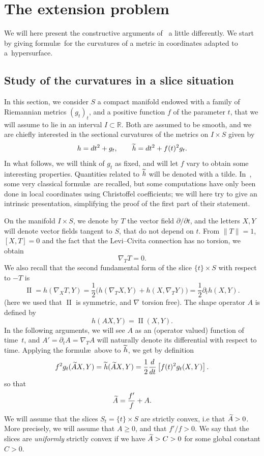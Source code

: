 \documentclass[AHL,Unicode,longabstracts,published]{cedram}
\newcommand{\R}{\mathbb{R}}
\DeclareMathOperator{\II}{II}
\theoremstyle{plain}
\let\oldtilde\tilde
\renewcommand*{\tilde}[1]{\mathchoice{\widetilde{#1}}{\widetilde{#1}}{\oldtilde{#1}}{\oldtilde{#1}}}
\begin{document}
\section{The extension problem}
\label{sec:metric-extension}

We will here present the constructive arguments of~\cite{Chen-Erchenko-Gogolev} a little differently. We start by giving formul\ae\ for the curvatures of a metric in coordinates adapted to a~hypersurface.

\subsection{Study of the curvatures in a slice situation}

In this section, we consider $S$ a compact manifold endowed with a family of Riemannian metrics $(g_t)_t$, and a positive function $f$ of the parameter $t$, that we will assume to lie in an interval $I\subset \R$. Both are assumed to be smooth, and we are chiefly interested in the sectional curvatures of the metrics on $I\times S$ given by
\begin{equation}\label{eq:conformal-slice}
h= dt^2 + g_t,\qquad \tilde{h} = dt^2 + f(t)^2 g_t.
\end{equation}
In what follows, we will think of $g_t$ as fixed, and will let $f$ vary to obtain some interesting properties. Quantities related to $\tilde{h}$ will be denoted with a tilde. In~\cite{Chen-Erchenko-Gogolev}, some very classical formul\ae\ are recalled, but some computations have only been done in local coordinates using Christoffel coefficients; we will here try to give an intrinsic presentation, simplifying the proof of the first part of their statement.

On the manifold $I\times S$, we denote by $T$ the vector field $\partial/\partial t$, and the letters $X,Y$ will denote vector fields tangent to $S$, that do not depend on $t$. From $\|T\|=1$, $[X,T]=0$ and the fact that the Levi--Civita connection has no torsion, we obtain
\[
\nabla_T T = 0.
\]
We also recall that the second fundamental form of the slice $\{t\}\times S$ with respect to $-T$ is
\[
\II = h(\nabla_X T, Y) =\frac{1}{2}\bigl(h(\nabla_T X, Y) + h(X, \nabla_T Y)\bigr) = \frac{1}{2}\partial_t h(X,Y).
\]
(here we used that $\II$ is symmetric, and $\nabla$ torsion free). The shape operator $A$ is defined by
\[
h(AX,Y) = \II(X,Y).
\]
In the following arguments, we will see $A$ as an (operator valued) function of time~$t$, and $A'=\partial_t A = \nabla_T A$ will naturally denote its differential with respect to time. Applying the formul\ae\ above to $\tilde{h}$, we get by definition
\[
f^2 g_t(\tilde{A} X,Y) = \tilde{h}(\tilde{A}X,Y)= \frac{1}{2} \frac{d}{dt}\left[f(t)^2 g_t(X,Y) \right].
\]
so that
\begin{equation}\label{eq:tildeA}
\tilde{A} = \frac{f'}{f} + A.
\end{equation}
We will assume that the slices $S_t =\{t\} \times S$ are strictly convex, i.e that $\tilde{A} > 0$. More precisely, we will assume that $A\geq 0$, and that $f'/f > 0$. We say that the slices are \emph{uniformly} strictly convex if we have $\tilde{A}> C >0$ for some global constant $C>0$.
\end{document}
